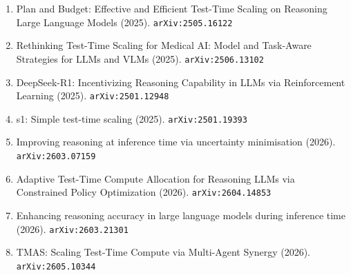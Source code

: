 \documentclass[11pt]{article}
\begin{document}
\begin{enumerate}
  \item Plan and Budget: Effective and Efficient Test-Time Scaling on Reasoning Large Language Models (2025). \texttt{arXiv:2505.16122}
  \item Rethinking Test-Time Scaling for Medical AI: Model and Task-Aware Strategies for LLMs and VLMs (2025). \texttt{arXiv:2506.13102}
  \item DeepSeek-R1: Incentivizing Reasoning Capability in LLMs via Reinforcement Learning (2025). \texttt{arXiv:2501.12948}
  \item s1: Simple test-time scaling (2025). \texttt{arXiv:2501.19393}
  \item Improving reasoning at inference time via uncertainty minimisation (2026). \texttt{arXiv:2603.07159}
  \item Adaptive Test-Time Compute Allocation for Reasoning LLMs via Constrained Policy Optimization (2026). \texttt{arXiv:2604.14853}
  \item Enhancing reasoning accuracy in large language models during inference time (2026). \texttt{arXiv:2603.21301}
  \item TMAS: Scaling Test-Time Compute via Multi-Agent Synergy (2026). \texttt{arXiv:2605.10344}
\end{enumerate}
\end{document}

